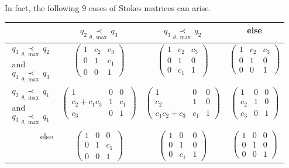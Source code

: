 In fact, the following $9$ cases of Stokes matrices can arise.
\begin{center}
  \def\arraystretch{1.3}
  \setlength\tabcolsep{4mm}
  \begin{tabular}{r|c|c|c}
    & $q_2 \underset{\theta,\max}{\prec} q_3$
    & $q_3 \underset{\theta,\max}{\prec} q_2$
    & else
    \tabularnewline
    \hline
    $\substack{q_1 \underset{\theta,\max}{\prec} q_2\\\text{and}
    \\q_1 \underset{\theta,\max}{\prec} q_3}$
    & $\begin{pmatrix} 1 & c_2 & c_3 \\0 & 1 & c_1 \\0 & 0 & 1 \end{pmatrix}$
   \cellcolor{blue!15}
    & $\begin{pmatrix} 1 & c_2 & c_3 \\0 & 1 & 0 \\0 & c_1 & 1 \end{pmatrix}$
   \cellcolor{blue!15}
    & $\begin{pmatrix} 1 & c_2 & c_3 \\0 & 1 & 0 \\0 & 0 & 1 \end{pmatrix}$
   \cellcolor{green!15}
    \tabularnewline
    \hline
    $\substack{q_2 \underset{\theta,\max}{\prec} q_1\\\text{and}
    \\q_3 \underset{\theta,\max}{\prec} q_1}$
    & $\begin{pmatrix} 1 & 0 & 0 \\c_2+c_1c_3 & 1 & c_1 \\c_3 & 0 & 1 \end{pmatrix}$
   \cellcolor{blue!15}
    & $\begin{pmatrix} 1 & 0 & 0 \\c_2 & 1 & 0 \\c_1c_2+c_3 & c_1 & 1 \end{pmatrix}$
   \cellcolor{blue!15}
    & $\begin{pmatrix} 1 & 0 & 0 \\c_2 & 1 & 0 \\c_3 & 0 & 1 \end{pmatrix}$
   \cellcolor{green!15}
    \tabularnewline
    \hline
    else
    & $\begin{pmatrix} 1 & 0 & 0 \\0 & 1 & c_1 \\0 & 0 & 1 \end{pmatrix}$
   \cellcolor{purple!15}
    & $\begin{pmatrix} 1 & 0 & 0 \\0 & 1 & 0 \\0 & c_1 & 1 \end{pmatrix}$
   \cellcolor{purple!15}
    & $\begin{pmatrix} 1 & 0 & 0 \\0 & 1 & 0 \\0 & 0 & 1 \end{pmatrix}$
  \end{tabular}
\end{center}
